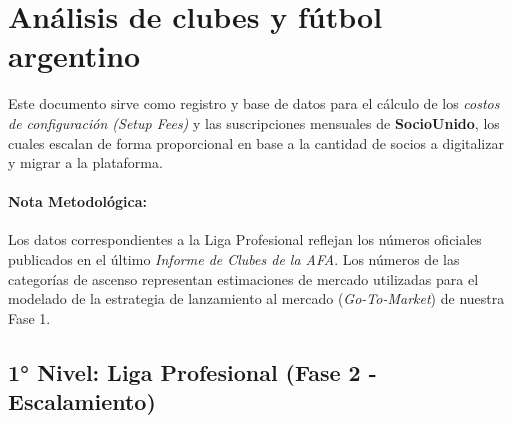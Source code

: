 \section{Análisis de clubes y fútbol argentino}

Este documento sirve como registro y base de datos para el cálculo de los \textit{costos de configuración (Setup Fees)} y las suscripciones mensuales de \textbf{SocioUnido}, los cuales escalan de forma proporcional en base a la cantidad de socios a digitalizar y migrar a la plataforma.

\paragraph{Nota Metodológica:} Los datos correspondientes a la Liga Profesional reflejan los números oficiales publicados en el último \textit{Informe de Clubes de la AFA}. Los números de las categorías de ascenso representan estimaciones de mercado utilizadas para el modelado de la estrategia de lanzamiento al mercado (\textit{Go-To-Market}) de nuestra Fase 1.

\subsection{1° Nivel: Liga Profesional (Fase 2 - Escalamiento)}

